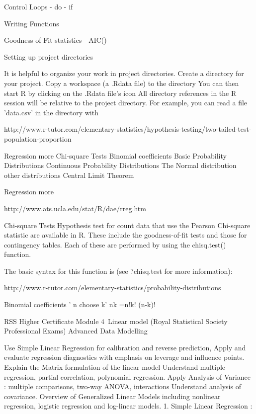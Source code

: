 Control Loops
 - do 
 - if 

Writing Functions

Goodness of Fit statistics
 - AIC()




Setting up project directories

It is helpful to organize your work in project directories.
Create a directory for your project.
Copy a workspace (a .Rdata file) to the directory
You can then start R by clicking on the .Rdata file's icon
All directory references in the R session will be relative to the project directory. For example, you can read a file 'data.csv' in the directory with


 
http://www.r-tutor.com/elementary-statistics/hypothesis-testing/two-tailed-test-population-proportion
 

Regression more
Chi-square Tests
Binomial coefficients
Basic Probability Distributions
Continuous Probability Distributions
The Normal distribution
other distributions
Central Limit Theorem

Regression more

http://www.ats.ucla.edu/stat/R/dae/rreg.htm


 

Chi-square Tests
Hypothesis test for count data that use the Pearson Chi-square statistic are available in R.
These include the goodness-of-fit tests and those for contingency tables. Each of these are
performed by using the chisq.test() function. 

The basic syntax for this function is (see ?chisq.test for more information): 
 
http://www.r-tutor.com/elementary-statistics/probability-distributions




Binomial coefficients
' n choose k'
nk =n!k! (n-k)!

RSS Higher Certificate Module 4 Linear model
(Royal Statistical Society Professional Exams)
Advanced Data Modelling

Use Simple Linear Regression for calibration and reverse prediction,
Apply and evaluate regression diagnostics with emphasis on leverage and influence points.
Explain the Matrix formulation of the linear model
Understand multiple regression, partial correlation, polynomial regression.
Apply Analysis of Variance : multiple comparisons, two-way ANOVA, interactions
Understand analysis of covariance.
Overview of Generalized Linear Models including nonlinear regression, logistic regression and log-linear models.
1. Simple Linear Regression :

